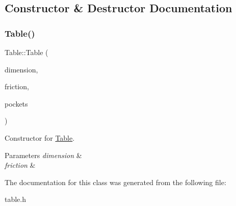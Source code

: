\subsection{Constructor \& Destructor Documentation}
\mbox{\label{class_table_aa12fd8e1655bfdf20ba5bfbe7e6c9b0f}} 
\subsubsection{\texorpdfstring{Table()}{Table()}}
{\footnotesize\ttfamily Table\+::\+Table (\begin{DoxyParamCaption}\item[{const Q\+Size \&}]{dimension,  }\item[{float}]{friction,  }\item[{vector$<$ unique\+\_\+ptr$<$ \mbox{\hyperlink{class_pocket}{Pocket}} $>$$>$ \&}]{pockets }\end{DoxyParamCaption})\hspace{0.3cm}{\ttfamily [inline]}}



Constructor for \mbox{\hyperlink{class_table}{Table}}. 


\begin{DoxyParams}{Parameters}
{\em dimension} & \\
\hline
{\em friction} & \\
\hline
\end{DoxyParams}


The documentation for this class was generated from the following file\+:\begin{DoxyCompactItemize}
\item 
table.\+h\end{DoxyCompactItemize}
